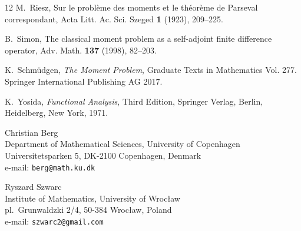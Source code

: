 \documentclass [12pt]{article}
\begin{document}
\begin{thebibliography}{12}
 M.~Riesz, Sur le probl{\`e}me des moments et le th{\'e}or{\`e}me de Parseval correspondant, Acta Litt. Ac. Sci. Szeged {\bf 1} (1923), 209--225.

 B.~Simon, The classical moment problem as a self-adjoint finite difference operator, Adv. Math. {\bf 137} (1998), 82--203.

 K.~Schm\"{u}dgen, {\it The Moment Problem}, Graduate Texts in Mathematics Vol. 277. Springer International Publishing AG 2017. 

 K.~Yosida, {\it Functional Analysis}, Third Edition, Springer Verlag, Berlin, Heidelberg, New York, 1971.  
\end{thebibliography}

\noindent
Christian Berg\\
Department of Mathematical Sciences, University of Copenhagen\\
Universitetsparken 5, DK-2100 Copenhagen, Denmark\\
e-mail: {\tt{berg@math.ku.dk}}

\vspace{0.4cm}
\noindent
Ryszard Szwarc\\
Institute of Mathematics, University of Wroc{\l}aw\\
pl.\ Grunwaldzki 2/4, 50-384 Wroc{\l}aw, Poland\\ 
e-mail: {\tt{szwarc2@gmail.com}}
\end{document}
